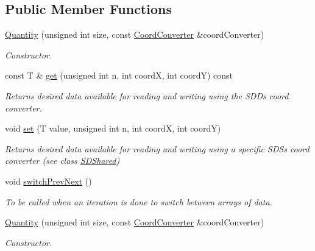 \subsection*{Public Member Functions}
\begin{DoxyCompactItemize}
\item 
\hyperlink{classQuantity_ab07b278cfe453e82756684b1730efc95}{Quantity} (unsigned int size, const \hyperlink{classCoordConverter}{Coord\+Converter} \&coord\+Converter)
\begin{DoxyCompactList}\small\item\em Constructor. \end{DoxyCompactList}\item 
const T \& \hyperlink{classQuantity_ac89252c633f43297f2df6fd6291c94b4}{get} (unsigned int n, int coordX, int coordY) const
\begin{DoxyCompactList}\small\item\em Returns desired data available for reading and writing using the S\+DD\textquotesingle{}s coord converter. \end{DoxyCompactList}\item 
void \hyperlink{classQuantity_a10c68498d1dfe59535a6f07c0627c8d4}{set} (T value, unsigned int n, int coordX, int coordY)
\begin{DoxyCompactList}\small\item\em Returns desired data available for reading and writing using a specific S\+DS\textquotesingle{}s coord converter (see class \hyperlink{classSDShared}{S\+D\+Shared}) \end{DoxyCompactList}\item 
\mbox{\label{classQuantity_af0799b7702ab9c7724399a6d76a41ea9}} 
void \hyperlink{classQuantity_af0799b7702ab9c7724399a6d76a41ea9}{switch\+Prev\+Next} ()
\begin{DoxyCompactList}\small\item\em To be called when an iteration is done to switch between arrays of data. \end{DoxyCompactList}\item 
\hyperlink{classQuantity_ab07b278cfe453e82756684b1730efc95}{Quantity} (unsigned int size, const \hyperlink{classCoordConverter}{Coord\+Converter} \&coord\+Converter)
\begin{DoxyCompactList}\small\item\em Constructor. \end{DoxyCompactList}\item 

\end{DoxyCompactItemize}
